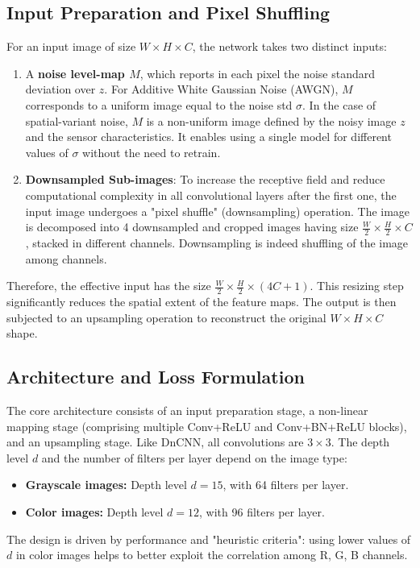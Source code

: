 \subsection{Input Preparation and Pixel Shuffling}
For an input image of size $W \times H \times C$, the network takes two distinct inputs:
\begin{enumerate}
    \item A \textbf{noise level-map $M$}, which reports in each pixel the noise standard deviation over $z$. For Additive White Gaussian Noise (AWGN), $M$ corresponds to a uniform image equal to the noise std $\sigma$. In the case of spatial-variant noise, $M$ is a non-uniform image defined by the noisy image $z$ and the sensor characteristics. It enables using a single model for different values of $\sigma$ without the need to retrain.
    \item \textbf{Downsampled Sub-images}: To increase the receptive field and reduce computational complexity in all convolutional layers after the first one, the input image undergoes a "pixel shuffle" (downsampling) operation. The image is decomposed into 4 downsampled and cropped images having size $\frac{W}{2} \times \frac{H}{2} \times C$, stacked in different channels. Downsampling is indeed shuffling of the image among channels.
\end{enumerate}
Therefore, the effective input has the size $\frac{W}{2} \times \frac{H}{2} \times (4C + 1)$. This resizing step significantly reduces the spatial extent of the feature maps. The output is then subjected to an upsampling operation to reconstruct the original $W \times H \times C$ shape.

\subsection{Architecture and Loss Formulation}
The core architecture consists of an input preparation stage, a non-linear mapping stage (comprising multiple Conv+ReLU and Conv+BN+ReLU blocks), and an upsampling stage. Like DnCNN, all convolutions are $3 \times 3$. The depth level $d$ and the number of filters per layer depend on the image type:
\begin{itemize}
    \item \textbf{Grayscale images:} Depth level $d=15$, with 64 filters per layer.
    \item \textbf{Color images:} Depth level $d=12$, with 96 filters per layer.
\end{itemize}
The design is driven by performance and "heuristic criteria": using lower values of $d$ in color images helps to better exploit the correlation among R, G, B channels.

